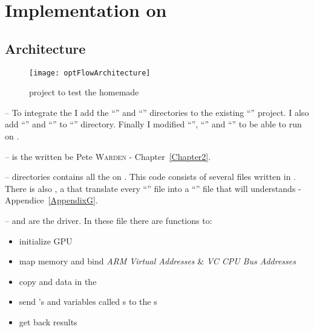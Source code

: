 \section{Implementation on \vc}

\subsection{Architecture}

\begin{figure}[!htbp]
	\centering
	\texttt{[image: optFlowArchitecture]}
\caption{ project to test the homemade \api}
	\label{optFlowFig}
\end{figure}
\FloatBarrier

-- To integrate the \api{} I add the \enquote{} and \enquote{} directories to the existing \enquote{} project. I also add \enquote{} and \enquote{} to \enquote{} directory. Finally I modified \enquote{}, \enquote{} and \enquote{} to be able to run \flow{}  on \vc.

--  is the  written be Pete \textsc{Warden} - Chapter~\ref{Chapter2}.

--  directories contains all the  on \vc. This code consists of several  files written in .\\
There is also , a  that translate every \enquote{} file into a \enquote{} file that \vc{} will understands - Appendice~\ref{AppendixG}.

--  and  are the  driver. In these file there are functions to:
\begin{itemize}
	\item initialize GPU
	\item map \ram{} memory and bind \emph{ARM Virtual Addresses} \& \emph{VC CPU Bus Addresses}
	\item copy  and data in the \ram
	\item send 's  and variables called \uni{}s to the \qpu{}s
	\item get back results
\end{itemize}


